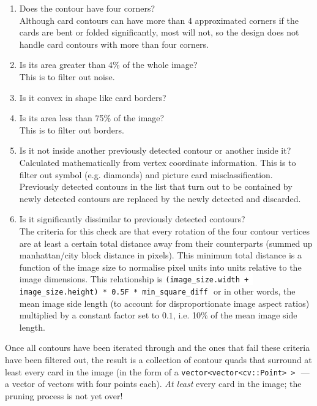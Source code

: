 \documentclass[a4paper,12pt,notitlepage]{article}
\newcommand{\code}[1]{\colorbox{white}{\lstinline[basicstyle=\ttfamily\color{black}]|#1|} }
\begin{document}
			\begin{enumerate}
				\item Does the contour have four corners?\\[4px]
					Although card contours can have more than 4 approximated corners if the cards are bent or folded significantly, most will not, so the design does not handle card contours with more than four corners.
				\item Is its area greater than 4\% of the whole image?\\[4px]
					This is to filter out noise.
				\item Is it convex in shape like card borders?
				\item Is its area less than 75\% of the image?\\[4px]
					This is to filter out borders.
				\item Is it not inside another previously detected contour or another inside it?\\[4px]
					Calculated mathematically from vertex coordinate information. This is to filter out symbol (e.g. diamonds) and picture card misclassification. Previously detected contours in the list that turn out to be contained by newly detected contours are replaced by the newly detected and discarded.
				\item Is it significantly dissimilar to previously detected contours?\\[4px]
					The criteria for this check are that every rotation of the four contour vertices are at least a certain total distance away from their counterparts (summed up manhattan/city block distance in pixels). This minimum total distance is a function of the image size to normalise pixel units into units relative to the image dimensions. This relationship is \code{(image_size.width + image_size.height) * 0.5F * min_square_diff} or in other words, the mean image side length (to account for disproportionate image aspect ratios) multiplied by a constant factor set to $0.1$, i.e. 10\% of the mean image side length.
			\end{enumerate}

			Once all contours have been iterated through and the ones that fail these criteria have been filtered out, the result is a collection of contour quads that surround at least every card in the image (in the form of a \code{vector<vector<cv::Point> >} --- a vector of vectors with four points each). \emph{At least} every card in the image; the pruning process is not yet over!
\end{document}
